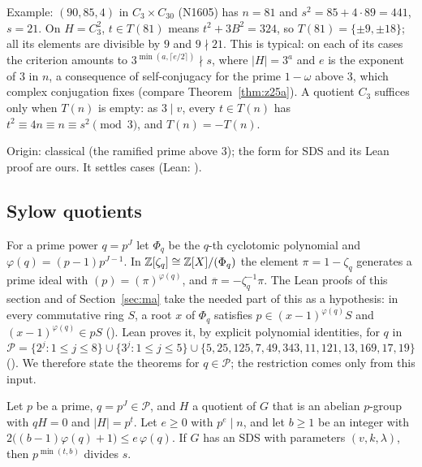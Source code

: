 \begin{remark}\label{rem:z19}
Example: $(90,85,4)$ in $C_3 \times C_{30}$ (N1605) has $n = 81$ and $s^2 = 85 + 4 \cdot 89 =
441$, $s = 21$. On $H = C_3^2$, $t \in T(81)$ means $t^2 + 3B^2 = 324$, so $T(81) = \{\pm 9, \pm
18\}$; all its elements are divisible by $9$ and $9 \nmid 21$. This is typical: on each of
its cases the criterion amounts to $3^{\min(a, \lceil e/2 \rceil)} \nmid s$, where $|H| = 3^a$ and
$e$ is the exponent of $3$ in $n$, a consequence of self-conjugacy for the prime $1 - \omega$ above
$3$, which complex conjugation fixes (compare Theorem~\ref{thm:z25a}). A quotient $C_3$ suffices
only when $T(n)$ is empty: as $3 \mid v$, every $t \in T(n)$ has $t^2 \equiv 4n \equiv n \equiv s^2
\pmod 3$, and $T(n) = -T(n)$.

Origin: classical (the ramified prime above $3$); the form for SDS and its Lean proof are ours. It
settles  cases (Lean: ).
\end{remark}

\subsection{Sylow quotients}\label{sec:sylow}

For a prime power $q = p^J$ let $\Phi_q$ be the $q$-th cyclotomic polynomial and
$\varphi(q) = (p-1)p^{J-1}$. In $\mathbb{Z}[\zeta_q] \cong \mathbb{Z}[X]/(\Phi_q)$ the element $\pi = 1 - \zeta_q$
generates a prime ideal with $(p) = (\pi)^{\varphi(q)}$, and $\overline{\pi} = -\zeta_q^{-1}\pi$.
The Lean proofs of this section and of Section~\ref{sec:ma} take the needed part of this as a
hypothesis: in every commutative ring $S$, a root $x$ of $\Phi_q$ satisfies
$p \in (x - 1)^{\varphi(q)} S$ and $(x-1)^{\varphi(q)} \in pS$ ().
Lean proves it, by explicit polynomial identities, for $q$ in
\begin{equation}\label{eq:cyclo}
  \mathcal{P} = \{2^j : 1 \le j \le 8\} \cup \{3^j : 1 \le j \le 5\} \cup
  \{5, 25, 125, 7, 49, 343, 11, 121, 13, 169, 17, 19\}
\end{equation}
(). We therefore state the theorems for $q \in
\mathcal{P}$; the restriction comes only from this input.

\begin{theorem}\label{thm:z25a}
Let $p$ be a prime, $q = p^J \in \mathcal{P}$, and $H$ a quotient of $G$ that is an abelian
$p$-group with $qH = 0$ and $|H| = p^t$. Let $e \ge 0$ with $p^e \mid n$, and let $b \ge 1$ be an
integer with $2\bigl((b-1)\varphi(q) + 1\bigr) \le e\,\varphi(q)$. If $G$ has an SDS with
parameters $(v,k,\lambda)$, then $p^{\min(t,b)}$ divides $s$.
\end{theorem}

